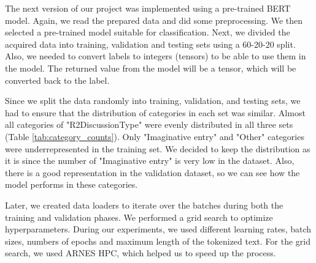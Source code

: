 \documentclass[fleqn,moreauthors,10pt]{ds_report}
\begin{document}
The next version of our project was implemented using a pre-trained BERT model. Again, we read the prepared data and did some preprocessing. We then selected a pre-trained model suitable for classification. Next, we divided the acquired data into training, validation and testing sets using a 60-20-20 split.
Also, we needed to convert labels to integers (tensors) to be able to use them in the model. The returned value from the model will be a tensor, which will be converted back to the label.

Since we split the data randomly into training, validation, and testing sets, we had to ensure that the distribution of categories in each set was similar.
Almost all categories of "R2DiscussionType" were evenly distributed in all three sets (Table \ref{tab:category_counts}).
Only "Imaginative entry" and "Other" categories were underrepresented in the training set. We decided to keep the distribution as it is 
since the number of "Imaginative entry" is very low in the dataset. Also, there is a good representation in the validation dataset, 
so we can see how the model performs in these categories.

\begin{table}[htbp]
    \centering
    \vspace{0.2cm}
    \caption{Category counts for train, validation, and test data}
    \label{tab:category_counts}
\end{table}



Later, we created data loaders to iterate over the batches during both the training and validation phases. We performed a grid search to optimize hyperparameters. During our experiments, we used different learning rates, batch sizes, numbers of epochs and maximum length of the tokenized text. For the grid search, we used ARNES HPC, which helped us to speed up the process. 
\end{document}
